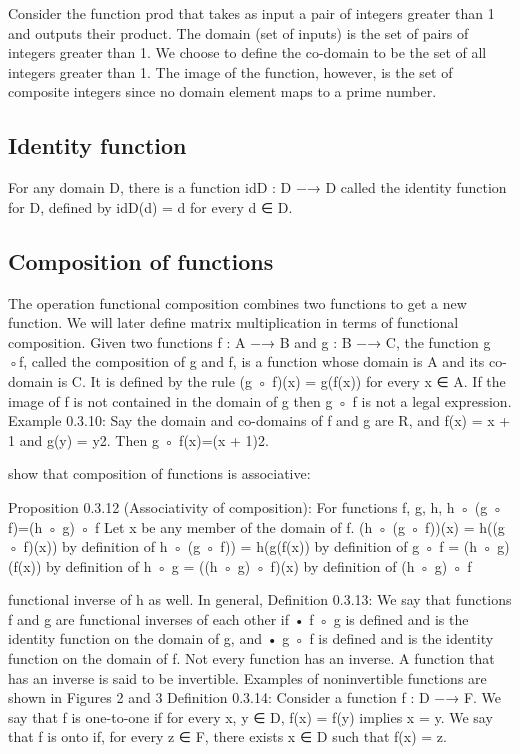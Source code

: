 Consider the function prod that takes as input a pair of integers greater than  1 and outputs their product. The domain (set of inputs) is the set of pairs of integers greater  than 1. We choose to define the co-domain to be the set of all integers greater than 1. The  image of the function, however, is the set of composite integers since no domain element maps  to a prime number. 

\subsection{Identity function} 
For any domain D, there is a function idD : D −→ D called the identity function for D, defined  by  idD(d) = d  for every d ∈ D. 

\subsection{Composition of functions}  
The operation functional composition combines two functions to get a new function. We will later  define matrix multiplication in terms of functional composition. Given two functions f : A −→ B  and g : B −→ C, the function g ◦f, called the composition of g and f, is a function whose domain  is A and its co-domain is C. It is defined by the rule  (g ◦ f)(x) = g(f(x))  for every x ∈ A.  If the image of f is not contained in the domain of g then g ◦ f is not a legal expression.  Example 0.3.10: Say the domain and co-domains of f and g are R, and f(x) = x + 1 and  g(y) = y2. Then g ◦ f(x)=(x + 1)2. 

show that composition of functions is associative:  

Proposition 0.3.12 (Associativity of composition): For functions f, g, h,  h ◦ (g ◦ f)=(h ◦ g) ◦ f 
Let x be any member of the domain of f.  
(h ◦ (g ◦ f))(x) = h((g ◦ f)(x)) by definition of h ◦ (g ◦ f))  
                 = h(g(f(x)) by definition of g ◦ f  
                 = (h ◦ g)(f(x)) by definition of h ◦ g  
                 = ((h ◦ g) ◦ f)(x) by definition of (h ◦ g) ◦ f 
                 
functional inverse of h as well.  In general,  Definition 0.3.13: We say that functions f and g are functional inverses of each other if  • f ◦ g is defined and is the identity function on the domain of g, and  • g ◦ f is defined and is the identity function on the domain of f.  Not every function has an inverse. A function that has an inverse is said to be invertible.  Examples of noninvertible functions are shown in Figures 2 and 3  Definition 0.3.14: Consider a function f : D −→ F. We say that f is one-to-one if for every  x, y ∈ D, f(x) = f(y) implies x = y. We say that f is onto if, for every z ∈ F, there exists  x ∈ D such that f(x) = z. 

